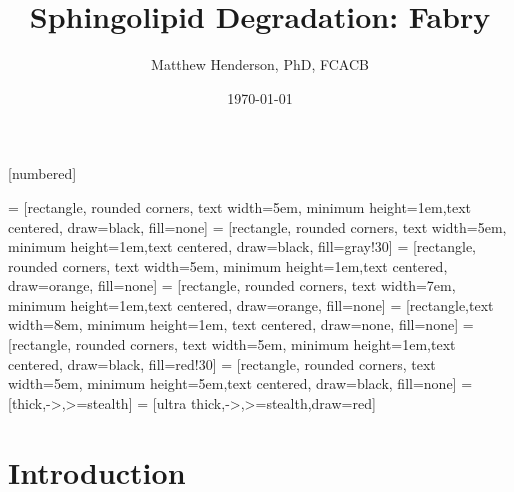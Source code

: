 \documentclass[presentation, smaller]{beamer}
\author{Matthew Henderson, PhD, FCACB}
\date{\today}
\title{Sphingolipid Degradation: Fabry}
\institute[NSO]{Newborn Screening Ontario | The University of Ottawa}
\begin{document}
\maketitle

\vspace{220pt}
\beamertemplatenavigationsymbolsempty
{}[numbered]

 = [rectangle, rounded corners, text width=5em, minimum height=1em,text centered, draw=black, fill=none]
 = [rectangle, rounded corners, text width=5em, minimum height=1em,text centered, draw=black, fill=gray!30]
 = [rectangle, rounded corners, text width=5em, minimum height=1em,text centered, draw=orange, fill=none]
 = [rectangle, rounded corners, text width=7em, minimum height=1em,text centered, draw=orange, fill=none]
 = [rectangle,text width=8em, minimum height=1em, text centered, draw=none, fill=none]
 = [rectangle, rounded corners, text width=5em, minimum height=1em,text centered, draw=black, fill=red!30]
 = [rectangle, rounded corners, text width=5em, minimum height=5em,text centered, draw=black, fill=none]
 = [thick,->,>=stealth]
 = [ultra thick,->,>=stealth,draw=red]

\section{Introduction}
\label{sec:orgheadline9}
\end{document}
